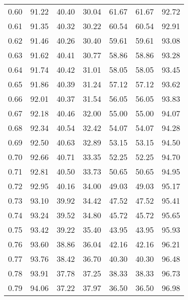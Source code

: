 \begin{tabular}{|c|c|c|c|c|c|c|}
      0.60 &     91.22 &     40.40 &      30.04 &   61.67 &      61.67 &         92.72 \\
      0.61 &     91.35 &     40.32 &      30.22 &   60.54 &      60.54 &         92.91 \\
      0.62 &     91.46 &     40.26 &      30.40 &   59.61 &      59.61 &         93.08 \\
      0.63 &     91.62 &     40.41 &      30.77 &   58.86 &      58.86 &         93.28 \\
      0.64 &     91.74 &     40.42 &      31.01 &   58.05 &      58.05 &         93.45 \\
      0.65 &     91.86 &     40.39 &      31.24 &   57.12 &      57.12 &         93.62 \\
      0.66 &     92.01 &     40.37 &      31.54 &   56.05 &      56.05 &         93.83 \\
      0.67 &     92.18 &     40.46 &      32.00 &   55.00 &      55.00 &         94.07 \\
      0.68 &     92.34 &     40.54 &      32.42 &   54.07 &      54.07 &         94.28 \\
      0.69 &     92.50 &     40.63 &      32.89 &   53.15 &      53.15 &         94.50 \\
      0.70 &     92.66 &     40.71 &      33.35 &   52.25 &      52.25 &         94.70 \\
      0.71 &     92.81 &     40.50 &      33.73 &   50.65 &      50.65 &         94.95 \\
      0.72 &     92.95 &     40.16 &      34.00 &   49.03 &      49.03 &         95.17 \\
      0.73 &     93.10 &     39.92 &      34.42 &   47.52 &      47.52 &         95.41 \\
      0.74 &     93.24 &     39.52 &      34.80 &   45.72 &      45.72 &         95.65 \\
      0.75 &     93.42 &     39.22 &      35.40 &   43.95 &      43.95 &         95.93 \\
      0.76 &     93.60 &     38.86 &      36.04 &   42.16 &      42.16 &         96.21 \\
      0.77 &     93.76 &     38.42 &      36.70 &   40.30 &      40.30 &         96.48 \\
      0.78 &     93.91 &     37.78 &      37.25 &   38.33 &      38.33 &         96.73 \\
      0.79 &     94.06 &     37.22 &      37.97 &   36.50 &      36.50 &         96.98 \\

\end{tabular}
